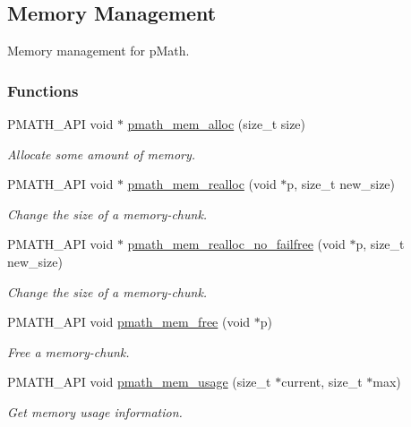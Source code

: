 \hypertarget{group__memory}{
\subsection{Memory Management}
\label{group__memory}
}
Memory management for pMath.  


\subsubsection*{Functions}
\begin{CompactItemize}
\item 
PMATH\_\-API void $\ast$ \hyperlink{group__memory_g856c326c830629de5637912fa8bc2bc9}{pmath\_\-mem\_\-alloc} (size\_\-t size)
\begin{CompactList}\small\item\em Allocate some amount of memory. \item\end{CompactList}\item 
PMATH\_\-API void $\ast$ \hyperlink{group__memory_g59dc67a7de0dc3111dfb0424df8d8244}{pmath\_\-mem\_\-realloc} (void $\ast$p, size\_\-t new\_\-size)
\begin{CompactList}\small\item\em Change the size of a memory-chunk. \item\end{CompactList}\item 
PMATH\_\-API void $\ast$ \hyperlink{group__memory_g212c329fa5e691842e46580bd94f6e4c}{pmath\_\-mem\_\-realloc\_\-no\_\-failfree} (void $\ast$p, size\_\-t new\_\-size)
\begin{CompactList}\small\item\em Change the size of a memory-chunk. \item\end{CompactList}\item 
PMATH\_\-API void \hyperlink{group__memory_g936d3001151c35052812e597eb7dce4f}{pmath\_\-mem\_\-free} (void $\ast$p)
\begin{CompactList}\small\item\em Free a memory-chunk. \item\end{CompactList}\item 
PMATH\_\-API void \hyperlink{group__memory_gfabd51edae8c23c11efdc4540d7b6a0d}{pmath\_\-mem\_\-usage} (size\_\-t $\ast$current, size\_\-t $\ast$max)
\begin{CompactList}\small\item\em Get memory usage information. \item\end{CompactList}\end{CompactItemize}


